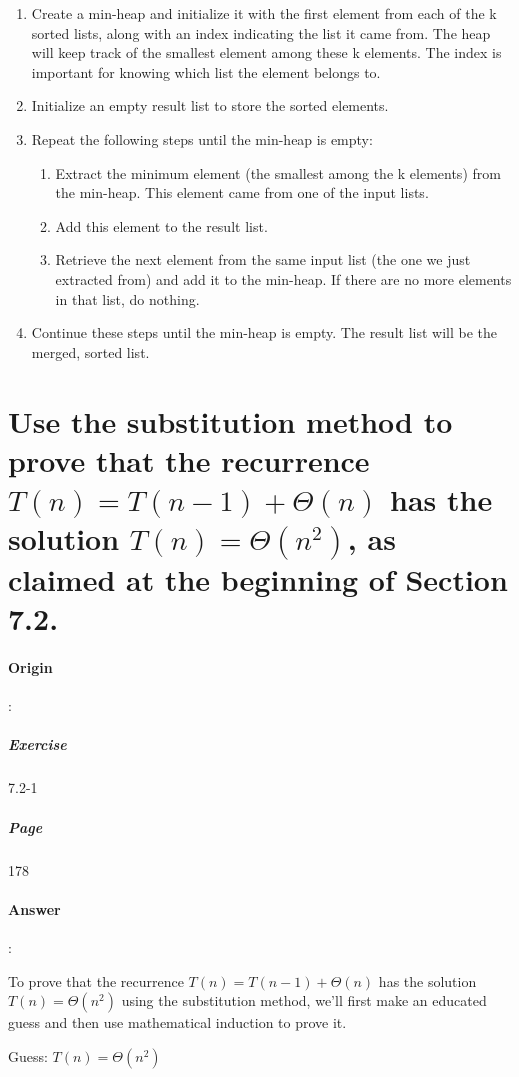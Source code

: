 \documentclass{article}
\begin{document}
  \begin{enumerate}
    \item Create a min-heap and initialize it with the first element from each of the k sorted lists, along with an index indicating the list it came from. The heap will keep track of the smallest element among these k elements. The index is important for knowing which list the element belongs to.
    \item Initialize an empty result list to store the sorted elements.
    \item Repeat the following steps until the min-heap is empty:
    
    \begin{enumerate}
      \item Extract the minimum element (the smallest among the k elements) from the min-heap. This element came from one of the input lists.
      \item Add this element to the result list.
      \item Retrieve the next element from the same input list (the one we just extracted from) and add it to the min-heap. If there are no more elements in that list, do nothing.
    \end{enumerate}
    \item Continue these steps until the min-heap is empty. The result list will be the merged, sorted list.
  \end{enumerate}
  

  \section{Use the substitution method to prove that the recurrence $T (n) = T(n-1) + \Theta(n)$ has the solution $T(n) = \Theta(n^2)$, as claimed at the beginning of Section 7.2.}
  \paragraph{Origin}:
    \subparagraph{Exercise}7.2-1
    \subparagraph{Page}178
  \paragraph{Answer}:
  

To prove that the recurrence $T(n) = T(n - 1) + \Theta(n)$ has the solution $T(n) = \Theta(n^2)$ using the substitution method, we'll first make an educated guess and then use mathematical induction to prove it.

Guess: $T(n) = \Theta(n^2)$
\end{document}
